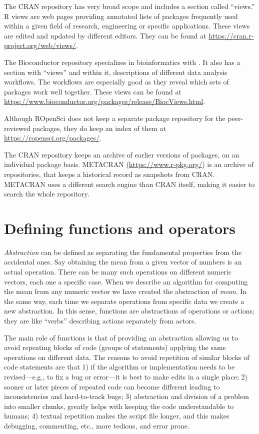 \documentclass[krantz2]{krantz}\usepackage{knitr}
\begin{document}
The CRAN repository has very broad scope and includes a section called ``views.'' R views are web pages providing annotated lists of packages frequently used within a given field of research, engineering or specific applications. These views are edited and updated by different editors. They can be found at \url{https://cran.r-project.org/web/views/}.

The Bioconductor repository specializes in bioinformatics with \Rlang. It also has a section with ``views'' and within it, descriptions of different data analysis workflows. The workflows are especially good as they reveal which sets of packages work well together. These views can be found at \url{https://www.bioconductor.org/packages/release/BiocViews.html}.

Although ROpenSci does not keep a separate package repository for the peer-reviewed packages, they do keep an index of them at \url{https://ropensci.org/packages/}.

The CRAN repository keeps an archive of earlier versions of packages, on an individual package basis. METACRAN (\url{https://www.r-pkg.org/}) is an archive of repositories, that keeps a historical record as snapshots from CRAN. METACRAN uses a different search engine than CRAN itself, making it easier to search the whole repository.

\section{Defining functions and operators}\label{sec:script:functions}

\emph{Abstraction} can be defined as separating the fundamental properties from the accidental ones. Say obtaining the mean from a given vector of numbers is an actual operation. There can be many such operations on different numeric vectors, each one a specific case. When we describe an algorithm for computing the mean from any numeric vector we have created the abstraction of \emph{mean}. In the same way, each time we separate operations from specific data we create a new abstraction. In this sense, functions are abstractions of operations or actions; they are like ``verbs'' describing actions separately from actors.

The main role of functions is that of providing an abstraction allowing us to avoid repeating blocks of code (groups of statements) applying the same operations on different data. The reasons to avoid repetition of similar blocks of code statements are that 1) if the algorithm or implementation needs to be revised---e.g., to fix a bug or error---it is best to make edits in a single place; 2) sooner or later pieces of repeated code can become different leading to inconsistencies and hard-to-track bugs; 3) abstraction and division of a problem into smaller chunks, greatly helps with keeping the code understandable to humans; 4) textual repetition makes the script file longer, and this makes debugging, commenting, etc., more tedious, and error prone.
\end{document}
